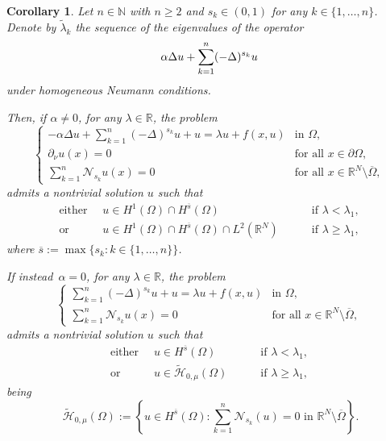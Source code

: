 \documentclass[12pt,a4paper,intlimits,sumlimits]{amsart}
\def \N {\mathbb{N}}
\def \R {\mathbb{R}}
\theoremstyle{definition}
\theoremstyle{plain}
\newtheorem{corollary}[definition]{Corollary}
\numberwithin{equation}{section}
\renewcommand{\ge}{\geqslant}
\begin{document}
\begin{corollary}\label{cor2}
Let $n\in\N$ with $n\ge 2$ and $s_k\in (0, 1)$ for any $k\in\{1, \dots, n\}$.  Denote by $\widetilde\lambda_k$ the sequence of the eigenvalues of the operator
\[
\-\alpha\Delta u  + \displaystyle\sum_{k=1}^n(-\Delta)^{s_k} u
\]
under homogeneous Neumann conditions.

Then, if $\alpha\neq 0$, for any $\lambda\in\R$, the problem
\begin{equation}\label{P21}
\begin{cases}
-\alpha\Delta u  + \displaystyle\sum_{k=1}^n(-\Delta)^{s_k} u +u=\lambda u +f(x,u)  &\mbox{in }\Omega,\\
\partial_\nu u(x)=0  &\mbox{for all } x\in \partial\Omega,\\
\displaystyle\sum_{k=1}^n\mathscr N_{s_k} u(x)=0 &\mbox{for all }x\in \R^N \setminus \overline{\Omega}, 
\end{cases}
\end{equation}
admits a nontrivial solution $u$ such that
\begin{equation}\label{spazicor2}
\begin{alignedat}{2}
\mbox{either } \ & u\in H^1(\Omega)\cap H^{\overline s} (\Omega)  \quad&&\mbox{ if } \lambda<\lambda_1,\\
\mbox{or } \ &u\in H^1(\Omega)\cap H^{\overline s} (\Omega)\cap L^2(\R^N) \quad&&\mbox{ if } \lambda\ge\lambda_1,
\end{alignedat}
\end{equation}
where $\overline s:=\max\{s_k : k\in\{1,\dots, n\}\}$.

If instead~$\alpha=0$, for any $\lambda\in\R$, the problem
\begin{equation}\label{P22}
\begin{cases}
\displaystyle\sum_{k=1}^n (-\Delta)^{s_k} u +u=\lambda u +f(x,u)  &\mbox{in }\Omega,\\
\displaystyle\sum_{k=1}^n\mathscr N_{s_k} u(x)=0 &\mbox{for all }x\in \R^N \setminus \overline{\Omega}, 
\end{cases}
\end{equation}
admits a nontrivial solution $u$ such that
\begin{equation}\label{spazicor22}
\begin{alignedat}{2}
\mbox{either } \ & u\in H^{\overline s} (\Omega)  \quad&&\mbox{ if } \lambda<\lambda_1,\\
\mbox{or } \ &u\in \widetilde{\mathcal H}_{0, \mu} (\Omega) \quad&&\mbox{ if } \lambda\ge\lambda_1,
\end{alignedat}
\end{equation}
being
\[\
\widetilde{\mathcal H}_{0, \mu}(\Omega):=\left\{u\in H^{\overline s}(\Omega) : \sum_{k=1}^n\mathscr N_{s_k} (u)=0 \mbox{ in }\R^N\setminus \overline{\Omega}\right\}.
\]
\end{corollary}
\end{document}
